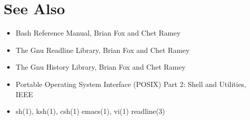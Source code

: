 \section{See Also}\label{sec:seealso}
\begin{itemize}[]
    \item[]Bash Reference Manual, Brian Fox and Chet Ramey
    
    \item[]The Gnu Readline Library, Brian Fox and Chet Ramey
    
    \item[]The Gnu History Library, Brian Fox and Chet Ramey
    
    \item[]Portable Operating System Interface (POSIX) Part 2: Shell and Utilities, IEEE
    
    \item[]sh(1), ksh(1), csh(1)
    emacs(1), vi(1)
    readline(3)
    \end{itemize}